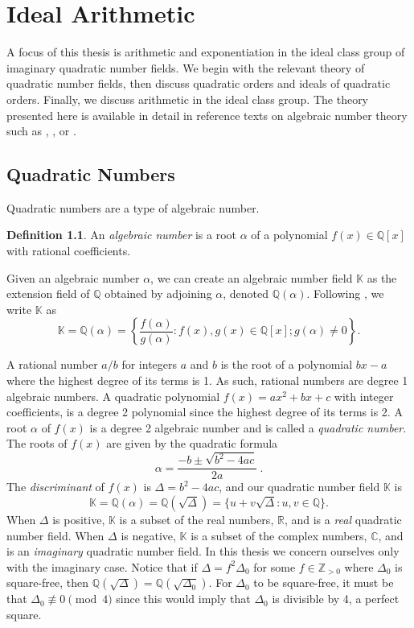 \documentclass{ucalgthes1}
\theoremstyle{definition}
\newtheorem{defn}[thm]{Definition}
\newcommand{\CC}{\mathbb{C}}
\newcommand{\RR}{\mathbb{R}}
\newcommand{\KK}{\mathbb{K}}
\newcommand{\QQ}{\mathbb{Q}}
\newcommand{\ZZgtz}{\mathbb{Z}_{>0}}
\begin{document}
\setcounter{chapter}{1}
\chapter{Ideal Arithmetic}
\label{chap:idealArithmetic}

A focus of this thesis is arithmetic and exponentiation in the ideal class group of imaginary quadratic number fields.  We begin with the relevant theory of quadratic number fields, then discuss quadratic orders and ideals of quadratic orders.  Finally, we discuss arithmetic in the ideal class group.  The theory presented here is available in detail in reference texts on algebraic number theory such as \cite{IR90}, \cite{Hua82}, or \cite{Coh80}. 



\section{Quadratic Numbers}

Quadratic numbers are a type of algebraic number.

\begin{defn}
An \emph{algebraic number} is a root $\alpha$ of a polynomial $f(x) \in \QQ[x]$ with rational coefficients.
\end{defn}

\noindent
Given an algebraic number $\alpha$, we can create an algebraic number field $\KK$ as the extension field of $\QQ$ obtained by adjoining $\alpha$, denoted $\QQ(\alpha)$. Following \cite[p.76]{Jacobson2009}, we write $\KK$ as 
\[
	\KK = \QQ(\alpha) = \left\{ \frac{f(\alpha)}{g(\alpha)} : f(x), g(x) \in \QQ[x]; g(\alpha) \ne 0 \right\}.
\]

\noindent
A rational number $a/b$ for integers $a$ and $b$ is the root of a polynomial $bx-a$ where the highest degree of its terms is 1.  As such, rational numbers are degree 1 algebraic numbers. A quadratic polynomial $f(x) = ax^2 + bx + c$ with integer coefficients, is a degree 2 polynomial since the highest degree of its terms is 2.  A root $\alpha$ of $f(x)$ is a degree 2 algebraic number and is called a \emph{quadratic number}.  The roots of $f(x)$ are given by the quadratic formula
\[
	\alpha = \frac{-b \pm \sqrt{b^2 - 4ac}}{2a} ~.
\]
The \emph{discriminant} of $f(x)$ is $\Delta = b^2 - 4ac$, and our quadratic number field $\KK$ is 
\[
	\KK = \QQ(\alpha) = \QQ(\sqrt{\Delta}) = \{u + v\sqrt{\Delta} : u,v \in \QQ\}.
\]
When $\Delta$ is positive, $\KK$ is a subset of the real numbers, $\RR$, and is a \emph{real} quadratic number field. When $\Delta$ is negative, $\KK$ is a subset of the complex numbers, $\CC$, and is an \emph{imaginary} quadratic number field.  In this thesis we concern ourselves only with the imaginary case.  Notice that if $\Delta = f^2 \Delta_0$ for some $f \in \ZZgtz$ where $\Delta_0$ is square-free, then $\QQ(\sqrt{\Delta}) = \QQ(\sqrt{\Delta_0})$. For $\Delta_0$ to be square-free, it must be that $\Delta_0 \not\equiv 0 \pmod 4$ since this would imply that $\Delta_0$ is divisible by 4, a perfect square.  
\end{document}
